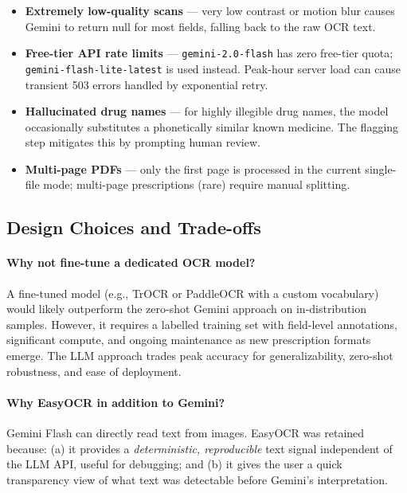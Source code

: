 \documentclass[12pt,a4paper]{article}
\begin{document}
\begin{itemize}[noitemsep]
    \item \textbf{Extremely low-quality scans} — very low contrast or motion blur
          causes Gemini to return null for most fields, falling back to the raw OCR text.
    \item \textbf{Free-tier API rate limits} — \texttt{gemini-2.0-flash} has zero
          free-tier quota; \texttt{gemini-flash-lite-latest} is used instead.
          Peak-hour server load can cause transient 503 errors handled by exponential retry.
    \item \textbf{Hallucinated drug names} — for highly illegible drug names, the model
          occasionally substitutes a phonetically similar known medicine.
          The flagging step mitigates this by prompting human review.
    \item \textbf{Multi-page PDFs} — only the first page is processed in the current
          single-file mode; multi-page prescriptions (rare) require manual splitting.
\end{itemize}

\subsection{Design Choices and Trade-offs}

\paragraph{Why not fine-tune a dedicated OCR model?}
A fine-tuned model (e.g., TrOCR or PaddleOCR with a custom vocabulary) would likely
outperform the zero-shot Gemini approach on in-distribution samples. However, it
requires a labelled training set with field-level annotations, significant compute,
and ongoing maintenance as new prescription formats emerge. The LLM approach trades
peak accuracy for generalizability, zero-shot robustness, and ease of deployment.

\paragraph{Why EasyOCR in addition to Gemini?}
Gemini Flash can directly read text from images. EasyOCR was retained because:
(a) it provides a \emph{deterministic, reproducible} text signal independent of
the LLM API, useful for debugging; and (b) it gives the user a quick transparency
view of what text was detectable before Gemini's interpretation.
\end{document}
